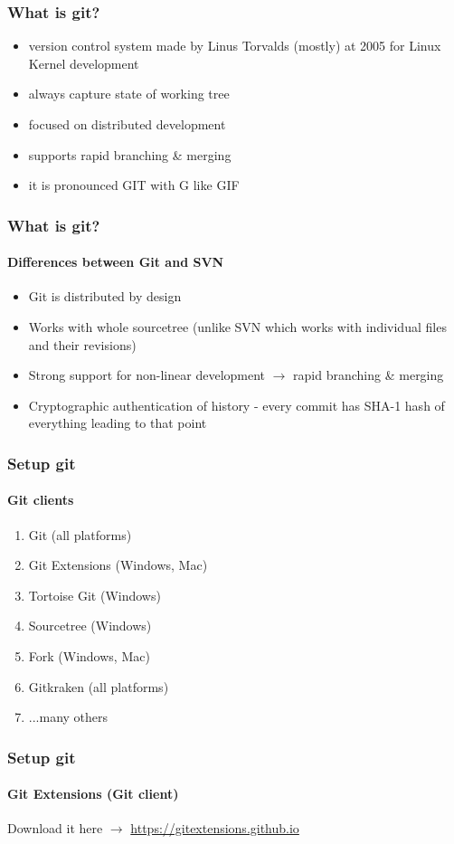 \documentclass{beamer}
\newcommand{\adjustimg}{%
  \checkoddpage%
  \ifoddpage\hspace*{\dimexpr\evensidemargin-\oddsidemargin}\else\hspace*{-\dimexpr\evensidemargin-\oddsidemargin}\fi%
}
\newcommand{\centerimg}[2][width=\textwidth]{%
  \makebox[\textwidth]{\adjustimg\texttt{[image: \#2]}}%
}
\begin{document}
    \begin{frame}
        \frametitle{What is git?}
        \begin{itemize}
            \item version control system made by Linus Torvalds (mostly) at 2005 for Linux Kernel development
            \item always capture state of working tree
            \item focused on distributed development
            \item supports rapid branching \& merging
            \item it is pronounced GIT with G like GIF ~
        \end{itemize}
    \end{frame}
    \begin{frame}
        \frametitle{What is git?}
        \framesubtitle{Differences between Git and SVN}
        \begin{itemize}
            \item Git is distributed by design
            \item Works with whole sourcetree (unlike SVN which works with individual files and their revisions)
            \item Strong support for non-linear development $\rightarrow$ rapid branching \& merging
            \item Cryptographic authentication of history - every commit has SHA-1 hash of everything leading to that point
        \end{itemize}
    \end{frame}
    
    \begin{frame}
        \frametitle{Setup git}
        \framesubtitle{Git clients}
        \begin{enumerate}
            \item Git (all platforms)
            \item Git Extensions (Windows, Mac)
            \item Tortoise Git (Windows)
            \item Sourcetree (Windows)
            \item Fork (Windows, Mac)
            \item Gitkraken (all platforms)
            \item ...many others
        \end{enumerate}
    \end{frame}
    \begin{frame}
        \frametitle{Setup git}
        \framesubtitle{Git Extensions (Git client)}
        \noindent\centerimg[width=\paperwidth]{gitex.png} 
        Download it here $\rightarrow$ \url{https://gitextensions.github.io}
    \end{frame}
\end{document}
